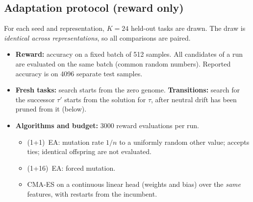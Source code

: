 \documentclass[11pt,a4paper]{article}
\theoremstyle{definition}
\theoremstyle{plain}
\theoremstyle{remark}
\begin{document}
\subsection{Adaptation protocol (reward only)}
For each seed and representation, $K=24$ held-out tasks are drawn. The draw is \emph{identical across representations}, so all comparisons are paired.
\begin{itemize}
\item \textbf{Reward:} accuracy on a fixed batch of 512 samples. All candidates of a run are evaluated on the same batch (common random numbers). Reported accuracy is on 4096 separate test samples.
\item \textbf{Fresh tasks:} search starts from the zero genome. \textbf{Transitions:} search for the successor $\tau'$ starts from the solution for $\tau$, after neutral drift has been pruned from it (below).
\item \textbf{Algorithms and budget:} 3000 reward evaluations per run.
  \begin{itemize}
  \item (1+1)~EA: mutation rate $1/n$ to a uniformly random other value; accepts ties; identical offspring are not evaluated.
  \item (1+16)~EA: forced mutation.
  \item CMA-ES on a continuous linear head (weights and bias) over the \emph{same} features, with restarts from the incumbent.
  \end{itemize}
\end{itemize}
\end{document}
